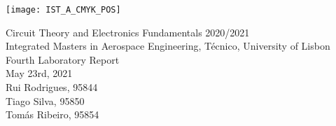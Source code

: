 
\thispagestyle {empty}

\texttt{[image: IST\_A\_CMYK\_POS]}

\begin{center}
%
\vspace{1.0cm}

\vspace{1cm}
{\FontLb Circuit Theory and Electronics Fundamentals 2020/2021} \\ %
\vspace{1cm}
{\FontSn Integrated Masters in Aerospace Engineering, Técnico, University of Lisbon} \\ %
\vspace{1cm}
{\FontSn Fourth Laboratory Report} \\
\vspace{1cm}
{\FontSn May 23rd, 2021} \\ %
%
\vspace{1cm}
{\FontSn Rui Rodrigues, 95844 \\ Tiago Silva, 95850\\ Tomás Ribeiro, 95854}

\end{center}

